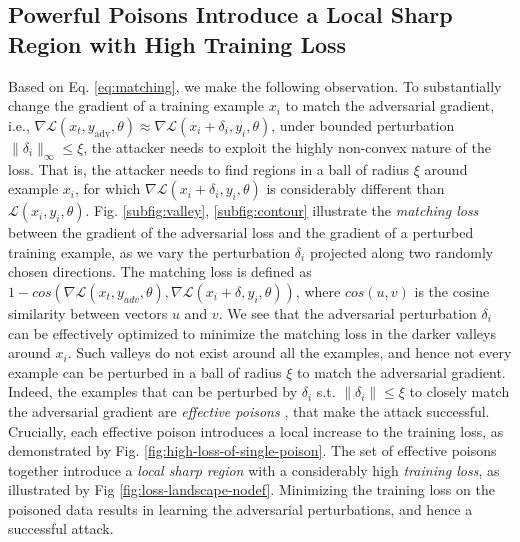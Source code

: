 \documentclass{article}
\begin{document}
\subsection{Powerful Poisons {Introduce a Local Sharp Region with High Training Loss}}
Based on Eq. \eqref{eq:matching}, we make the following observation. To substantially change the gradient of a training example $x_i$ to match the adversarial gradient, i.e., $\nabla\mathcal{L}(x_t,y_{\text{adv}},\theta)\approx \nabla\mathcal{L}(x_i+\delta_i,y_i,\theta)$, under bounded perturbation %
$\|\delta_i\|_\infty\leq\xi$, 
the attacker needs to 
exploit the highly non-convex nature of the loss. That is, the attacker needs to find 
regions in a ball of radius $\xi$ around example $x_i$, for which $\nabla \mathcal{L}(x_i+\delta_i,y_i,\theta)$ is considerably different than $\mathcal{L}(x_i,y_i,\theta)$.
Fig. \ref{subfig:valley}, \ref{subfig:contour} illustrate the \textit{matching loss} %
between the gradient of the adversarial loss and the gradient of a perturbed training example, as we vary the perturbation $\delta_i$ projected along two randomly chosen directions. The matching loss is defined as $1\!-\!cos\left(\nabla\mathcal{L}(x_t,y_{adv},\theta),\nabla \mathcal{L}(x_i+\delta,y_i,\theta) \right)$, %
where $cos(u,v)$ is the cosine similarity between vectors $u$ and $v$. 
We see that the adversarial perturbation $\delta_i$ can be effectively optimized to minimize the matching loss in the darker valleys around $x_i$. %
Such valleys do not exist %
around all the examples, and hence not every example can be perturbed in a ball of radius $\xi$ to match the adversarial gradient. Indeed, the examples that can be perturbed by $\delta_i$ s.t. $\|\delta_i\|\leq\xi$ to closely match the adversarial gradient are \textit{effective poisons} \cite{yang2022not}, that make the attack successful.
Crucially, each effective poison %
introduces a %
local increase to the {training loss}, as demonstrated by Fig. \ref{fig:high-loss-of-single-poison}.
The set of effective poisons together introduce a \textit{local sharp region} with a considerably high \textit{training loss}, as illustrated by Fig \ref{fig:loss-landscape-nodef}.
Minimizing the training loss on the poisoned data results in learning the adversarial perturbations, and hence a successful attack.
\end{document}
